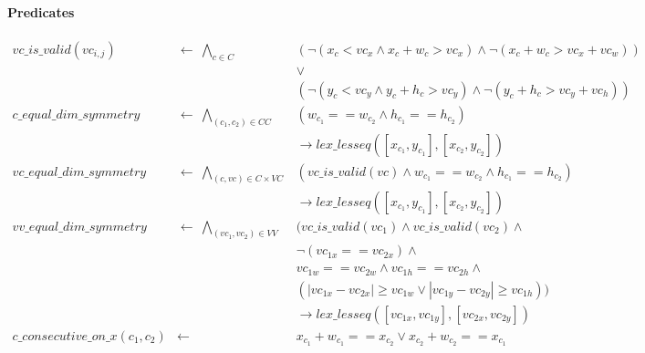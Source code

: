     \paragraph{Predicates}
    \begin{align*}
        vc\_is\_valid(vc_{i,j})     &\leftarrow\    \bigwedge_{c \in C} &  (\neg(x_c < vc_x \land x_c + w_c > vc_x) \land
                                                    \neg(x_c + w_c > vc_x + vc_w))                                  \\
                                                &&  \lor                                             \\
                                                &&  (\neg(y_c < vc_y \land y_c + h_c > vc_y) \land
                                                    \neg(y_c + h_c > vc_y + vc_h))                                  \\
        c\_equal\_dim\_symmetry &\leftarrow\        \bigwedge_{(c_1, c_2) \in CC} & (w_{c_1} == w_{c_2} \land h_{c_1} == h_{c_2})                   \\
                                                &&  \rightarrow lex\_lesseq([x_{c_1}, y_{c_1}], [x_{c_2}, y_{c_2}]) \\ 
        vc\_equal\_dim\_symmetry &\leftarrow\       \bigwedge_{(c, vc) \in C \times VC} & (vc\_is\_valid(vc) \land w_{c_1} == w_{c_2} \land h_{c_1} == h_{c_2})   \\
                                                &&  \rightarrow lex\_lesseq([x_{c_1}, y_{c_1}], [x_{c_2}, y_{c_2}])     \\      
        vv\_equal\_dim\_symmetry &\leftarrow\       \bigwedge_{(vc_1, vc_2) \in VV}
                                                &   (vc\_is\_valid(vc_1) \land vc\_is\_valid(vc_2) \land                         \\
                                                &&  \neg (vc_{1x} == vc_{2x}) \land \\
                                                &&  vc_{1w} == vc_{2w} \land vc_{1h} == vc_{2h} \land \\
                                                &&  (|vc_{1x} - vc_{2x}| \geq vc_{1w} \lor |vc_{1y} - vc_{2y}| \geq vc_{1h})) \\
                                                &&  \rightarrow lex\_lesseq([vc_{1x}, vc_{1y}], [vc_{2x}, vc_{2y}]) \\
        c\_consecutive\_on\_x(c_1, c_2) &\leftarrow  &   x_{c_1} + w_{c_1} == x_{c_2} \lor x_{c_2} + w_{c_2} == x_{c_1} \\

\end{align*}
